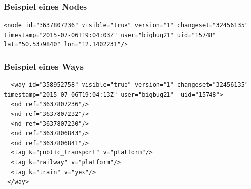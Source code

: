 \subsubsection{Beispiel eines Nodes}

\lstset{
  numbers=none,
  caption=Beispiel eines Nodes aus planet.osm,
  label=
}
\begin{lstlisting}
<node id="3637807236" visible="true" version="1" changeset="32456135" timestamp="2015-07-06T19:04:03Z" user="bigbug21" uid="15748" lat="50.5379840" lon="12.1402231"/>
\end{lstlisting}

\subsubsection{Beispiel eines Ways}
\lstset{
  numbers=none,
  caption=Beispiel eines Ways aus planet.osm,
  label=
}
\begin{lstlisting}
  <way id="358952758" visible="true" version="1" changeset="32456135" timestamp="2015-07-06T19:04:13Z" user="bigbug21"  uid="15748">
  <nd ref="3637807236"/>
  <nd ref="3637807232"/>
  <nd ref="3637807230"/>
  <nd ref="3637806843"/>
  <nd ref="3637806841"/>
  <tag k="public_transport" v="platform"/>
  <tag k="railway" v="platform"/>
  <tag k="train" v="yes"/>
 </way>
\end{lstlisting}

